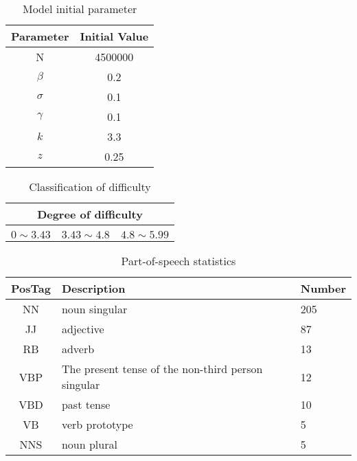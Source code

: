 \documentclass{mcmthesis}
\begin{document}
 \newpage
\begin{appendices}
\begin{table}[H]
	\tabcolsep=12pt
	\centering
	\renewcommand\arraystretch{1.2}
	\caption{\small Model initial parameter}
	\par\medskip
	\begin{tabular}{cc}
			\hline
			Parameter &  Initial Value \\
			\hline
			N  & 4500000 \\
			\rowcolor[gray]{.85}
			$ \beta  $	& 0.2  \\ 
			$ \sigma $  & 0.1\\ 
			\rowcolor[gray]{.85}
			$ \gamma $	& 0.1 \\ 
			$ k $		& 3.3 \\ 
			\rowcolor[gray]{.85}
			$ z $   	& 0.25 \\
			\hline
		\end{tabular}
\end{table}
\begin{table}[H]
	\centering
	\caption{\small Classification of difficulty}
	\begin{tabular}{ccc}
		\toprule[1.5pt]
		\multicolumn{3}{c}{Degree of difficulty} \\  \midrule[1.5pt]
		\makebox[0.1\textwidth][c]{Easy} 
		& \makebox[0.1\textwidth][c]{Middle} & \makebox[0.1\textwidth][c]{Diffcult} \\
		$0\sim 3.43$    & $3.43\sim 4.8$      & $4.8\sim 5.99$    \\  \bottomrule[1.5pt]
	\end{tabular}
\end{table}
\begin{table}[H]
	\centering
	\caption{Part-of-speech statistics}
	\tabcolsep=12pt
	\small
	\renewcommand\arraystretch{1.1}
	\par\medskip
	\begin{tabular}{cll}
		\hline
		PosTag &  Description & Number  \\
		\hline
		NN  & noun singular & 205 \\
		\rowcolor[gray]{.85}
		JJ & adjective & 87 \\
		RB &  adverb & 13 \\
		\rowcolor[gray]{.85}
		VBP & The present tense of the non-third person singular & 12 \\
		VBD  & past tense & 10 \\
		\rowcolor[gray]{.85}
		VB & verb prototype &5 \\
		NNS & noun plural & 5 \\

\end{tabular}
\end{table}
\end{appendices}
\end{document}
